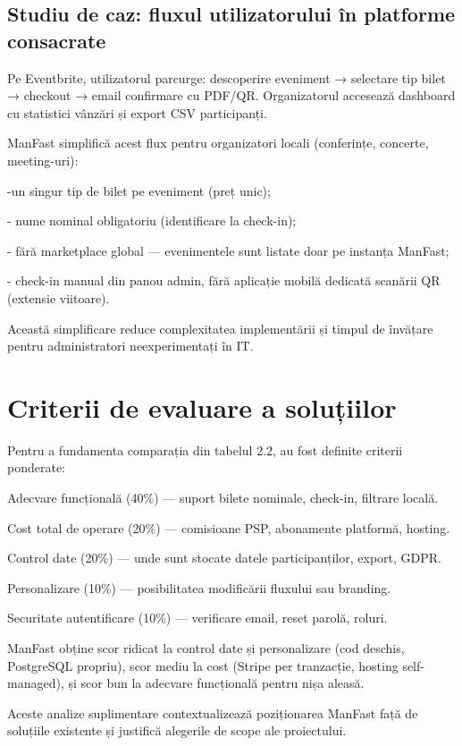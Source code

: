 \subsection{Studiu de caz: fluxul utilizatorului în platforme consacrate}

Pe Eventbrite, utilizatorul parcurge: descoperire eveniment → selectare tip bilet → checkout → email confirmare cu PDF/QR. Organizatorul accesează dashboard cu statistici vânzări și export CSV participanți.

ManFast simplifică acest flux pentru organizatori locali (conferințe, concerte, meeting-uri):

-un singur tip de bilet pe eveniment (preț unic);

- nume nominal obligatoriu (identificare la check-in);

- fără marketplace global — evenimentele sunt listate doar pe instanța ManFast;

- check-in manual din panou admin, fără aplicație mobilă dedicată scanării QR (extensie viitoare).

Această simplificare reduce complexitatea implementării și timpul de învățare pentru administratori neexperimentați în IT.

\section{Criterii de evaluare a soluțiilor}

Pentru a fundamenta comparația din tabelul 2.2, au fost definite criterii ponderate:

Adecvare funcțională (40\%) — suport bilete nominale, check-in, filtrare locală.

Cost total de operare (20\%) — comisioane PSP, abonamente platformă, hosting.

Control date (20\%) — unde sunt stocate datele participanților, export, GDPR.

Personalizare (10\%) — posibilitatea modificării fluxului sau branding.

Securitate autentificare (10\%) — verificare email, reset parolă, roluri.

ManFast obține scor ridicat la control date și personalizare (cod deschis, PostgreSQL propriu), scor mediu la cost (Stripe per tranzacție, hosting self-managed), și scor bun la adecvare funcțională pentru nișa aleasă.

Aceste analize suplimentare contextualizează poziționarea ManFast față de soluțiile existente și justifică alegerile de scope ale proiectului.

